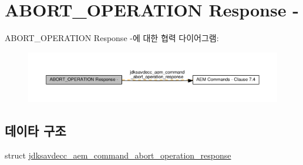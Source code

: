 \hypertarget{group__command__abort__operation__response}{}\section{A\+B\+O\+R\+T\+\_\+\+O\+P\+E\+R\+A\+T\+I\+ON Response -\/}
\label{group__command__abort__operation__response}
A\+B\+O\+R\+T\+\_\+\+O\+P\+E\+R\+A\+T\+I\+ON Response -\/에 대한 협력 다이어그램\+:
\nopagebreak
\begin{figure}[H]
\begin{center}
\leavevmode
\includegraphics[width=350pt]{group__command__abort__operation__response}
\end{center}
\end{figure}
\subsection*{데이타 구조}
\begin{DoxyCompactItemize}
\item 
struct \hyperlink{structjdksavdecc__aem__command__abort__operation__response}{jdksavdecc\+\_\+aem\+\_\+command\+\_\+abort\+\_\+operation\+\_\+response}
\end{DoxyCompactItemize}
